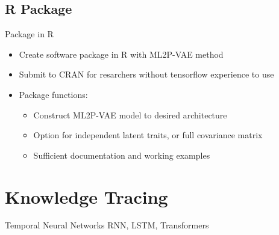 \documentclass{beamer}
\theoremstyle{definition}
\begin{document}
\subsection{R Package}
\begin{frame}{Package in R}
\begin{itemize}
  \item Create software package in R with ML2P-VAE method
  \item Submit to CRAN for resarchers without tensorflow experience to use
  \item<2-> Package functions:
  \begin{itemize}
    \item<2-> Construct ML2P-VAE model to desired architecture
    \item<2-> Option for independent latent traits, or full covariance matrix
    \item<2-> Sufficient documentation and working examples
  \end{itemize}
\end{itemize}
\end{frame}



\section{Knowledge Tracing}
\begin{frame}{Temporal Neural Networks}
  RNN, LSTM, Transformers
\end{frame}
\end{document}
